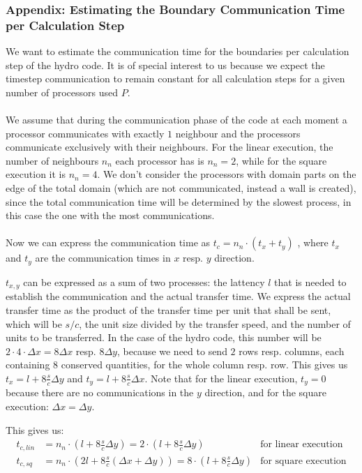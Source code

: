 \documentclass[8pt]{beamer}
\begin{document}
\tiny
\begin{frame}
	\frametitle{Appendix: Estimating the Boundary Communication Time per Calculation Step}
	
	We want to estimate the communication time for the boundaries per calculation step of the hydro code. It is of special interest to us because we expect the timestep communication to remain constant for all calculation steps for a given number of processors used $P$. \\~\\
	
	We assume that during the communication phase of the code at each moment a processor communicates with exactly $1$ neighbour and the processors communicate exclusively with their neighbours.
	For the linear execution, the number of neighbours $n_n$ each processor has is $n_n = 2$, while for the square execution it is $n_n=4$. We don't consider the processors with domain parts on the edge of the total domain (which are not communicated, instead a wall is created), since the total communication time will be determined by the slowest process, in this case the one with the most communications.\\~\\

	Now we can express the communication time as $t_c = n_n \cdot (t_x + t_y)$ , where $t_x$ and $t_y$ are the communication times in $x$ resp. $y$ direction.
	
	$t_{x,y}$ can be expressed as a sum of two processes: the lattency $l$ that is needed to establish the communication and the actual transfer time. We express the actual transfer time as the product of the transfer time per unit that shall be sent, which will be $s / c$, the unit size divided by the transfer speed, and the number of units to be transferred. In the case of the hydro code, this number will be $ 2 \cdot 4 \cdot \Delta x = 8 \Delta x$ resp. $8 \Delta y$, because we need to send $2$ rows resp. columns, each containing $8$ conserved quantities, for the whole column resp. row. This gives us $t_{x} = l + 8 \tfrac{s}{c} \Delta y$ and $t_{y} = l + 8 \tfrac{s}{c} \Delta x$. Note that for the linear execution, $t_y = 0$ because there are no communications in the $y$ direction, and for the square execution: $\Delta x = \Delta y$.
	
	This gives us:
	\begin{align*}
		t_{c,lin} &= n_n \cdot (l + 8 \tfrac{s}{c}\Delta y) = 2 \cdot  (l + 8 \tfrac{s}{c}\Delta y)	& \text{for linear execution}\\
		t_{c,sq} &= n_n \cdot \left(2l + 8 \tfrac{s}{c}(\Delta x + \Delta y)\right) = 8 \cdot (l + 8 \tfrac{s}{c}\Delta y )	& \text{for square execution}
	\end{align*}
	

\end{frame}
\end{document}
